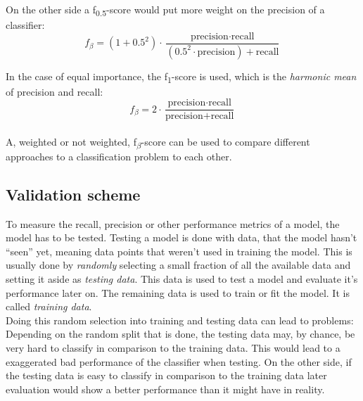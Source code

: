 On the other side a f\textsubscript{0.5}-score  would put more weight on the precision of a classifier:
\begin{equation} \label{eq:ev4}
f_\beta = (1+0.5^2) \cdot \frac{\text{precision} \cdot \text{recall}}{(0.5^2 \cdot \text{precision}) + \text{recall}}
\end{equation}	

In the case of equal importance, the f\textsubscript{1}-score is used, which is the \emph{harmonic mean} of precision and recall:
\begin{equation} \label{eq:ev5}
f_\beta = 2 \cdot \frac{\text{precision} \cdot \text{recall}}{\text{precision} + \text{recall}}
\end{equation}	
\\

A, weighted or not weighted, f\textsubscript{$\beta$}-score can be used to compare different approaches to a classification problem to each other. 

\subsection*{Validation scheme}

To measure the recall, precision or other performance metrics of a model, the model has to be tested. Testing a model is done with data, that the model hasn't ``seen'' yet, meaning data points that weren't used in training the model. This is usually done by \emph{randomly} selecting a small fraction of all the available data and setting it aside as \emph{testing data}. This data is used to test a model and evaluate it's performance later on. The remaining data is used to train or fit the model. It is called \emph{training data}. 
\\
Doing this random selection into training and testing data can lead to problems: Depending on the random split that is done, the testing data may, by chance, be very hard to classify in comparison to the training data. This would lead to a exaggerated bad performance of the classifier when testing. On the other side, if the testing data is easy to classify in comparison to the training data later evaluation would show a better performance than it might have in reality.
\\

